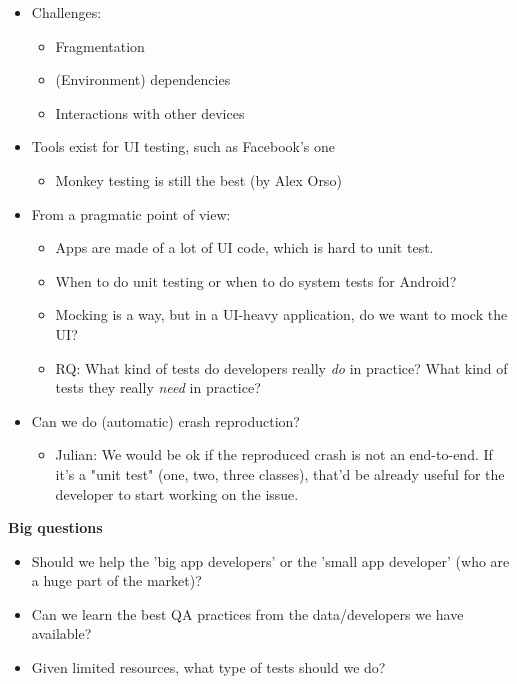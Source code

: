 \documentclass[a4paper]{article}
\begin{document}
\begin{itemize}
\item Challenges:
	\begin{itemize}
	\item Fragmentation
	\item (Environment) dependencies
	\item Interactions with other devices
	\end{itemize}

\item Tools exist for UI testing, such as Facebook's one
	\begin{itemize}
	\item Monkey testing is still the best (by Alex Orso)
	\end{itemize}

\item From a pragmatic point of view:
	\begin{itemize}
	\item Apps are made of a lot of UI code, which is hard to unit test.
	\item When to do unit testing or when to do system tests for Android?
	\item Mocking is a way, but in a UI-heavy application, do we want to mock the UI?
	\item RQ: What kind of tests do developers really \emph{do} in practice? What kind of tests they really \emph{need} in practice?
	\end{itemize}
	
\item Can we do (automatic) crash reproduction? 
	\begin{itemize}
	\item Julian: We would be ok if the reproduced crash is not an end-to-end. If it's a "unit test" (one, two, three classes), that'd be already useful for the developer to start working on the issue. 
	\end{itemize}
\end{itemize}

\textbf{Big questions}

\begin{itemize}
\item Should we help the 'big app developers' or the 'small app developer' (who are a huge part of the market)?
\item Can we learn the best QA practices from the data/developers we have available?
\item Given limited resources, what type of tests should we do?
\end{itemize}
\end{document}
